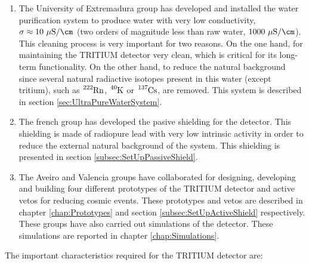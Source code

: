 \begin{enumerate}
\item{} The University of Extremadura group has developed and installed the water purification system to produce water with very low conductivity, $\sigma \approx 10~\mu\text{S}/\cm$ (two orders of magnitude less than raw water, $1000~\mu\text{S}/\cm$). This cleaning process is very important for two reasons. On the one hand, for maintaining the TRITIUM detector very clean, which is critical for its long-term functionality. On the other hand, to reduce the natural background since several natural radiactive isotopes present in this water (except tritium), such as $\ce{^{222}Rn}$, $\ce{^{40}K}$ or $\ce{^{137}Cs}$, are removed. This system is described in section \ref{sec:UltraPureWaterSystem}.

\item{} The french group has developed the pasive shielding for the detector. This shielding is made of radiopure lead with very low intrinsic activity in order to reduce the external natural background of the system. This shielding is presented in section \ref{subsec:SetUpPassiveShield}.

\item{} The Aveiro and Valencia groups have collaborated for designing, developing and building four different prototypes of the TRITIUM detector and active vetos for reducing cosmic events. These prototypes and vetos are described in chapter \ref{chap:Prototypes} and section \ref{subsec:SetUpActiveShield} respectively. These groups have also carried out simulations of the detector. These simulations are reported in chapter \ref{chap:Simulations}.

\end{enumerate}

The important characteristics required for the TRITIUM detector are:

